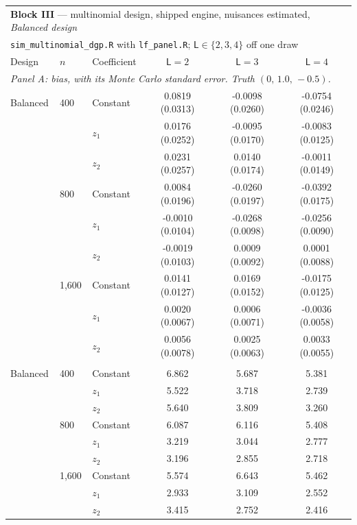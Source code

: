 \begin{tabular}{lllccc}
\toprule
\multicolumn{6}{l}{\textbf{Block III} --- multinomial design, shipped engine, nuisances estimated, \emph{Balanced design}} \\
\multicolumn{6}{l}{\quad \texttt{sim\_multinomial\_dgp.R} with \texttt{lf\_panel.R}; $\mathsf L\in\{2,3,4\}$ off one draw} \\
\midrule
Design & $n$ & Coefficient & $\mathsf L=2$ & $\mathsf L=3$ & $\mathsf L=4$ \\
\midrule
\multicolumn{6}{l}{\textit{Panel A: bias, with its Monte Carlo standard error.  Truth $(0,\,1.0,\,-0.5)$.}} \\
\midrule
Balanced & 400 & Constant & 0.0819 (0.0313) & -0.0098 (0.0260) & -0.0754 (0.0246) \\
 &  & $z_1$ & 0.0176 (0.0252) & -0.0095 (0.0170) & -0.0083 (0.0125) \\
 &  & $z_2$ & 0.0231 (0.0257) & 0.0140 (0.0174) & -0.0011 (0.0149) \\
 & 800 & Constant & 0.0084 (0.0196) & -0.0260 (0.0197) & -0.0392 (0.0175) \\
 &  & $z_1$ & -0.0010 (0.0104) & -0.0268 (0.0098) & -0.0256 (0.0090) \\
 &  & $z_2$ & -0.0019 (0.0103) & 0.0009 (0.0092) & 0.0001 (0.0088) \\
 & 1,600 & Constant & 0.0141 (0.0127) & 0.0169 (0.0152) & -0.0175 (0.0125) \\
 &  & $z_1$ & 0.0020 (0.0067) & 0.0006 (0.0071) & -0.0036 (0.0058) \\
 &  & $z_2$ & 0.0056 (0.0078) & 0.0025 (0.0063) & 0.0033 (0.0055) \\
\addlinespace
\multicolumn{6}{l}{\textit{Panel B: $\sqrt n\times$ s.d., which the theorem makes constant in $n$.}} \\
\midrule
Balanced & 400 & Constant & 6.862 & 5.687 & 5.381 \\
 &  & $z_1$ & 5.522 & 3.718 & 2.739 \\
 &  & $z_2$ & 5.640 & 3.809 & 3.260 \\
 & 800 & Constant & 6.087 & 6.116 & 5.408 \\
 &  & $z_1$ & 3.219 & 3.044 & 2.777 \\
 &  & $z_2$ & 3.196 & 2.855 & 2.718 \\
 & 1,600 & Constant & 5.574 & 6.643 & 5.462 \\
 &  & $z_1$ & 2.933 & 3.109 & 2.552 \\
 &  & $z_2$ & 3.415 & 2.752 & 2.416 \\

\end{tabular}
